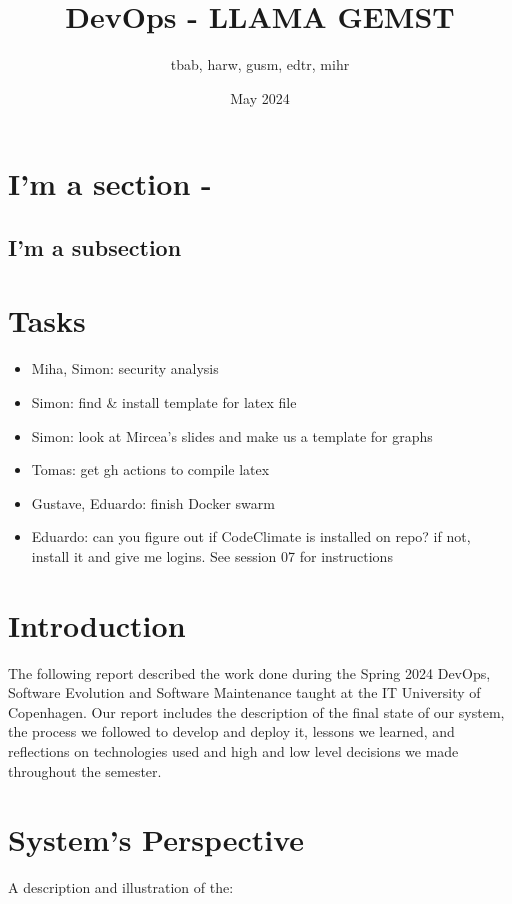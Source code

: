\documentclass{article}
\title{DevOps - LLAMA GEMST}
\author{tbab, harw, gusm, edtr, mihr}
\date{May 2024}
\begin{document}
\maketitle

\section{I'm a section -}
\subsection{I'm a subsection}

\section{Tasks}

\begin{itemize}
  \item Miha, Simon: security analysis
  \item Simon: find \& install template for latex file
  \item Simon: look at Mircea's slides and make us a template for graphs
  \item Tomas: get gh actions to compile latex
  \item Gustave, Eduardo: finish Docker swarm
  \item Eduardo: can you figure out if CodeClimate is installed on repo? if not, install it and give me logins. See session 07 for instructions
\end{itemize}

\section{Introduction}
The following report described the work done during the Spring 2024 DevOps, Software Evolution and Software Maintenance taught at the IT University of Copenhagen. Our report includes the description of the final state of our system, the process we followed to develop and deploy it, lessons we learned, and reflections on technologies used and high and low level decisions we made throughout the semester.

\section{System's Perspective}

A description and illustration of the:
\end{document}
